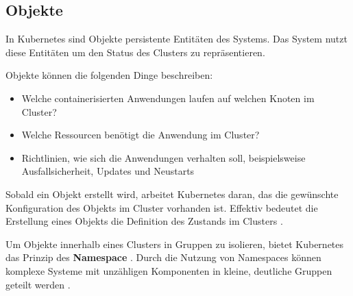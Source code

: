 \subsection{Objekte}
\label{sec:kubernetes:objekte}
In Kubernetes sind Objekte persistente Entitäten des Systems. 
Das System nutzt diese Entitäten um den Status des Clusters zu repräsentieren.

Objekte können die folgenden Dinge beschreiben:
\begin{itemize}
  \item Welche containerisierten Anwendungen laufen auf welchen Knoten im Cluster?
  \item Welche Ressourcen benötigt die Anwendung im Cluster?
  \item Richtlinien, wie sich die Anwendungen verhalten soll, beispielsweise Ausfallsicherheit, Updates und Neustarts
\end{itemize}

Sobald ein Objekt erstellt wird, arbeitet Kubernetes daran, das die gewünschte Konfiguration des Objekts
im Cluster vorhanden ist. 
Effektiv bedeutet die Erstellung eines Objekts die Definition des Zustands im Clusters \cite{KuberneteObjects_2021}.

Um Objekte innerhalb eines Clusters in Gruppen zu isolieren, bietet Kubernetes das Prinzip des \textbf{Namespace} \cite{kubernetesNamespaces}.
Durch die Nutzung von Namespaces können komplexe Systeme mit unzähligen Komponenten
in kleine, deutliche Gruppen geteilt werden \cite{Marko2018}.